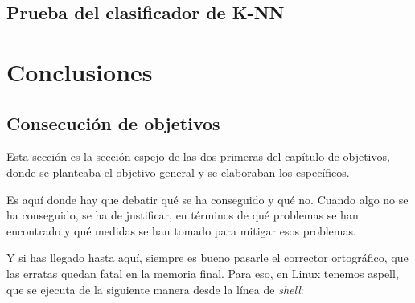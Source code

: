 \documentclass[a4paper, 12pt]{book}
\begin{document}
\section{Prueba del clasificador de K-NN} 
\label{sec:pruebaknn}







\cleardoublepage
\chapter{Conclusiones}
\label{chap:conclusiones}


\section{Consecución de objetivos}
\label{sec:consecucion-objetivos}

Esta sección es la sección espejo de las dos primeras del capítulo de objetivos, donde se planteaba el objetivo general y se elaboraban los específicos.

Es aquí donde hay que debatir qué se ha conseguido y qué no. 
Cuando algo no se ha conseguido, se ha de justificar, en términos de qué problemas se han encontrado y qué medidas se han tomado para mitigar esos problemas.

Y si has llegado hasta aquí, siempre es bueno pasarle el corrector ortográfico, que las erratas quedan fatal en la memoria final.
Para eso, en Linux tenemos aspell, que se ejecuta de la siguiente manera desde la línea de \emph{shell}:
\end{document}
